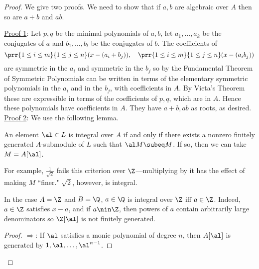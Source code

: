 \begin{proof}
We give two proofs. We need to show that if $a,b$ are algebraic over $A$ then so are $a+b$ and $ab$. 

\noindent \underline{Proof 1}: Let $p,q$ be the minimal polynomials of $a,b$, let $a_1,\ldots, a_k$ be the conjugates of $a$ and $b_1,\ldots, b_l$ be the conjugates of $b$. %
The coefficients of
\[%
\prr{1\le i\le m}{1\le j\le n} (x-(a_i+b_j)),\quad \prr{1\le i\le m}{1\le j\le n} (x-(a_ib_j))\]%
are symmetric in the $a_i$ and symmetric in the $b_j$ so by the Fundamental Theorem of Symmetric Polynomials can be written in terms of the elementary symmetric polynomials in the $a_i$ and in the $b_j$, with coefficients in $A$. By Vieta's Theorem these are expressible in terms of the coefficients of $p,q$, which are in $A$. Hence these polynomials have coefficients in $A$. They have $a+b,ab$ as roots, as desired.\\

\noindent \underline{Proof 2}:
We use the following lemma.
\begin{lem}
An element $\al\in L$ is integral over $A$ if and only if there exists a nonzero finitely generated $A$-submodule of $L$ such that $\al M\subeq M$. If so, then we can take $M=A[\al]$.
\end{lem}
\begin{ex}
For example, $\frac{1}{\sqrt2}$ fails this criterion over $\Z$---multiplying by it has the effect of making $M$ ``finer." $\sqrt{2}$, however, is integral.

In the case $A=\Z$ and $B=\Q$, $a\in \Q$ is integral over $\Z$ iff $a\in \Z$. Indeed, $a\in \Z$ satisfies $x-a$, and if $a\nin \Z$, then powers of $a$ contain arbitrarily large denominators so $\Z[\al]$ is not finitely generated.
\end{ex}
\begin{proof}
$\Rightarrow$: If $\al$ satisfies a monic polynomial of degree $n$, then $A[\al]$ is generated by $1,\al,\ldots, \al^{n-1}$.


\end{proof}
\end{proof}
